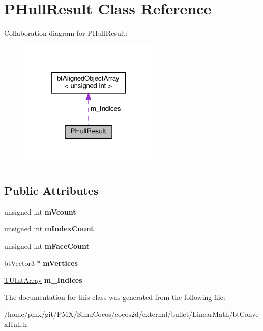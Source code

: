 \hypertarget{classPHullResult}{}\section{P\+Hull\+Result Class Reference}
\label{classPHullResult}


Collaboration diagram for P\+Hull\+Result\+:
\nopagebreak
\begin{figure}[H]
\begin{center}
\leavevmode
\includegraphics[width=189pt]{classPHullResult__coll__graph}
\end{center}
\end{figure}
\subsection*{Public Attributes}
\begin{DoxyCompactItemize}
\item 
\mbox{\label{classPHullResult_a50e0822115efee52ac33615a1a859833}} 
unsigned int {\bfseries m\+Vcount}
\item 
\mbox{\label{classPHullResult_a809b09d377bec9ce09b9057dc07b6ff0}} 
unsigned int {\bfseries m\+Index\+Count}
\item 
\mbox{\label{classPHullResult_a0b192809f9a774b503c6bd4bea3f4125}} 
unsigned int {\bfseries m\+Face\+Count}
\item 
\mbox{\label{classPHullResult_a944b74ae8a826719651085f73c22bb6a}} 
bt\+Vector3 $\ast$ {\bfseries m\+Vertices}
\item 
\mbox{\label{classPHullResult_ab1c631b0d6787bc1c63fbe4aa118e30a}} 
\hyperlink{classbtAlignedObjectArray}{T\+U\+Int\+Array} {\bfseries m\+\_\+\+Indices}
\end{DoxyCompactItemize}


The documentation for this class was generated from the following file\+:\begin{DoxyCompactItemize}
\item 
/home/pmx/git/\+P\+M\+X/\+Simu\+Cocos/cocos2d/external/bullet/\+Linear\+Math/bt\+Convex\+Hull.\+h\end{DoxyCompactItemize}

